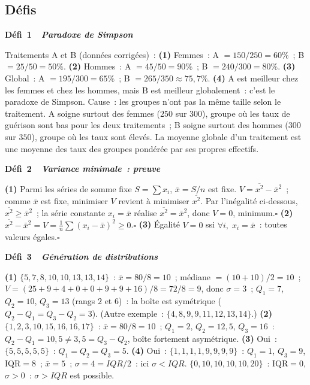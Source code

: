 \subsection*{D\'efis}

\noindent{}
{\color{BO}\bfseries\small D\'efi~1~\textendash\ \textit{Paradoxe de Simpson}}
\par\smallskip

Traitements A et B (donn\'ees corrig\'ees)~:
\textbf{(1)} Femmes~: A $=150/250=60\%$~; B $=25/50=50\%$.
\textbf{(2)} Hommes~: A $=45/50=90\%$~; B $=240/300=80\%$.
\textbf{(3)} Global~: A $=195/300=65\%$~; B $=265/350\approx75{,}7\%$.
\textbf{(4)} A est meilleur chez les femmes et chez les hommes, mais B est meilleur globalement~: c'est le paradoxe de Simpson.
Cause~: les groupes n'ont pas la m\^eme taille selon le traitement. A soigne surtout des femmes ($250$ sur $300$), groupe o\`u les taux de gu\'erison sont bas pour les deux traitements~; B soigne surtout des hommes ($300$ sur $350$), groupe o\`u les taux sont \'elev\'es. La moyenne globale d'un traitement est une moyenne des taux des groupes pond\'er\'ee par ses propres effectifs.

\noindent{}
{\color{BO}\bfseries\small D\'efi~2~\textendash\ \textit{Variance minimale~: preuve}}
\par\smallskip

\textbf{(1)} Parmi les s\'eries de somme fixe $S=\sum x_i$, $\bar{x}=S/n$ est fixe.
$V=\overline{x^2}-\bar{x}^2$~; comme $\bar{x}$ est fixe, minimiser $V$ revient \`a minimiser $\overline{x^2}$.
Par l'in\'egalit\'e ci-dessous, $\overline{x^2}\geq\bar{x}^2$~; la s\'erie constante $x_i=\bar{x}$
r\'ealise $\overline{x^2}=\bar{x}^2$, donc $V=0$, minimum.\hfill$\square$
\textbf{(2)} $\overline{x^2}-\bar{x}^2=V=\frac{1}{n}\sum(x_i-\bar{x})^2\geq0$.\hfill$\square$
\textbf{(3)} \'Egalit\'e $V=0$ ssi $\forall i,\;x_i=\bar{x}$~: toutes valeurs \'egales.\hfill$\square$

\noindent{}
{\color{BO}\bfseries\small D\'efi~3~\textendash\ \textit{G\'en\'eration de distributions}}
\par\smallskip

\textbf{(1)} $\{5,7,8,10,10,13,13,14\}$~: $\bar{x}=80/8=10$~; m\'ediane $=(10+10)/2=10$~;
$V=(25+9+4+0+0+9+9+16)/8=72/8=9$, donc $\sigma=3$~; $Q_1=7$, $Q_2=10$, $Q_3=13$ (rangs $2$ et $6$)~: la bo\^ite est sym\'etrique ($Q_2-Q_1=Q_3-Q_2=3$).
(Autre exemple~: $\{4,8,9,9,11,12,13,14\}$.)
\textbf{(2)} $\{1,2,3,10,15,16,16,17\}$~: $\bar{x}=80/8=10$~; $Q_1=2$, $Q_2=12{,}5$, $Q_3=16$~: $Q_2-Q_1=10{,}5\ne3{,}5=Q_3-Q_2$, bo\^ite fortement asym\'etrique.
\textbf{(3)} Oui~: $\{5,5,5,5,5\}$~: $Q_1=Q_2=Q_3=5$.
\textbf{(4)} Oui~: $\{1,1,1,1,9,9,9,9\}$~: $Q_1=1$, $Q_3=9$, IQR$=8$~;
$\bar{x}=5$~; $\sigma=4=IQR/2$~: ici $\sigma<IQR$.
$\{0,10,10,10,10,20\}$~: IQR$=0$, $\sigma>0$~: $\sigma>IQR$ est possible.


